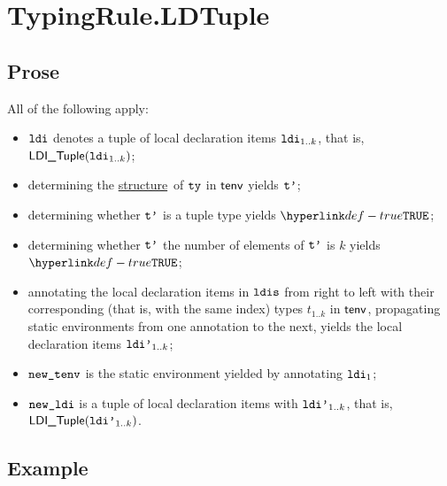 \documentclass{book}
\newcommand\ProseOrTypeError[0]{\ProseTerminateAs{\TypeErrorConfig}}
\newcommand\structure[0]{\hyperlink{def-structure}{structure}}
\begin{document}
\section{TypingRule.LDTuple\label{sec:TypingRule.LDTuple}}
\subsection{Prose}
All of the following apply:
\begin{itemize}
  \item $\texttt{ldi}$ denotes a tuple of local declaration items $\texttt{ldi}_{1..k}$, that is, $\textsf{LDI\_Tuple}(\texttt{ldi}_{1..k})$;
  \item determining the \structure\ of $\texttt{ty}$ in $\textsf{tenv}$ yields $\texttt{t'}$\ProseOrTypeError;
  \item determining whether $\texttt{t'}$ is a tuple type yields $\True$\ProseOrTypeError;
  \item determining whether $\texttt{t'}$ the number of elements of $\texttt{t'}$ is $k$ yields $\True$\ProseOrTypeError;
  \item annotating the local declaration items in $\texttt{ldis}$ from right to left with their corresponding
        (that is, with the same index) types $t_{1..k}$ in $\textsf{tenv}$,
        propagating static environments from one annotation to the next,
        yields the local declaration items $\texttt{ldi'}_{1..k}$\ProseOrTypeError;
  \item $\texttt{new\_tenv}$ is the static environment yielded by annotating $\texttt{ldi}_1$;
  \item $\texttt{new\_ldi}$ is a tuple of local declaration items with $\texttt{ldi'}_{1..k}$, that is, \\
        $\textsf{LDI\_Tuple}(\texttt{ldi'}_{1..k})$.
\end{itemize}

\subsection{Example}

\end{document}
